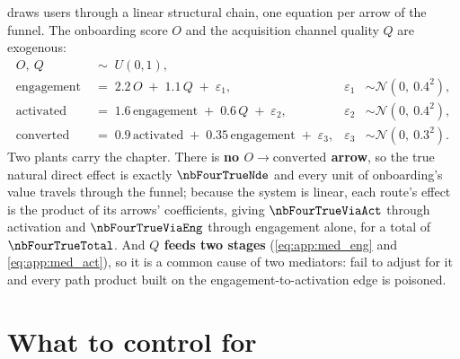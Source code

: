  draws \nbFourNObs{} users through a linear structural chain, one equation per
arrow of the funnel. The onboarding score $O$ and the acquisition channel quality $Q$ are
exogenous:
%
\begin{align}
  O,\ Q &\;\sim\; U(0,1), \label{eq:app:med_exog}\\
  \text{engagement} &\;=\; 2.2\,O \;+\; 1.1\,Q \;+\; \varepsilon_1,
        &\varepsilon_1 &\sim \mathcal N(0,\ 0.4^{2}), \label{eq:app:med_eng}\\
  \text{activated} &\;=\; 1.6\,\text{engagement} \;+\; 0.6\,Q \;+\; \varepsilon_2,
        &\varepsilon_2 &\sim \mathcal N(0,\ 0.4^{2}), \label{eq:app:med_act}\\
  \text{converted} &\;=\; 0.9\,\text{activated} \;+\; 0.35\,\text{engagement} \;+\; \varepsilon_3,
        &\varepsilon_3 &\sim \mathcal N(0,\ 0.3^{2}). \label{eq:app:med_conv}
\end{align}
%
Two plants carry the chapter. There is \textbf{no $O \to \text{converted}$ arrow}, so the true
natural direct effect is exactly $\nbFourTrueNde$ and every unit of onboarding's value travels
through the funnel; because the system is linear, each route's effect is the product of its arrows'
coefficients, giving $\nbFourTrueViaAct$ through activation and $\nbFourTrueViaEng$ through
engagement alone, for a total of $\nbFourTrueTotal$. And \textbf{$Q$ feeds two stages}
(\cref{eq:app:med_eng} and \cref{eq:app:med_act}), so it is a common cause of two mediators: fail
to adjust for it and every path product built on the engagement-to-activation edge is poisoned.

\section{What to control for}
\label{app:dgp:ctrl}

